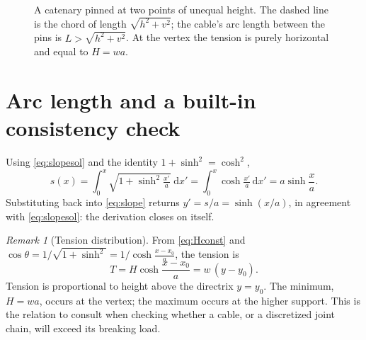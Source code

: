 \documentclass[11pt]{article}
\theoremstyle{remark}
\newtheorem*{remark}{Remark}
\newcommand{\dd}{\mathrm{d}}
\begin{document}
\begin{figure}[h]
\centering
{}
\caption{A catenary pinned at two points of unequal height. The dashed line is the chord
of length $\sqrt{h^2+v^2}$; the cable's arc length between the pins is $L>\sqrt{h^2+v^2}$.
At the vertex the tension is purely horizontal and equal to $H=wa$.}
\label{fig:catenary}
\end{figure}

\section{Arc length and a built-in consistency check}
Using \eqref{eq:slopesol} and the identity $1+\sinh^2=\cosh^2$,
\begin{equation}
  s(x) = \int_0^x \sqrt{1+\sinh^2\tfrac{x'}{a}}\;\dd x'
       = \int_0^x \cosh\tfrac{x'}{a}\,\dd x'
       = a\sinh\frac{x}{a}.
  \label{eq:arclen}
\end{equation}
Substituting back into \eqref{eq:slope} returns $y'=s/a=\sinh(x/a)$, in agreement with
\eqref{eq:slopesol}: the derivation closes on itself.

\begin{remark}[Tension distribution]
From \eqref{eq:Hconst} and $\cos\theta = 1/\sqrt{1+\sinh^2} = 1/\cosh\!\frac{x-x_0}{a}$,
the tension is
\[
  T = H\cosh\frac{x-x_0}{a} = w\,(y-y_0).
\]
Tension is proportional to height above the directrix $y=y_0$. The minimum, $H=wa$, occurs
at the vertex; the maximum occurs at the higher support. This is the relation to consult
when checking whether a cable, or a discretized joint chain, will exceed its breaking load.
\end{remark}
\end{document}
